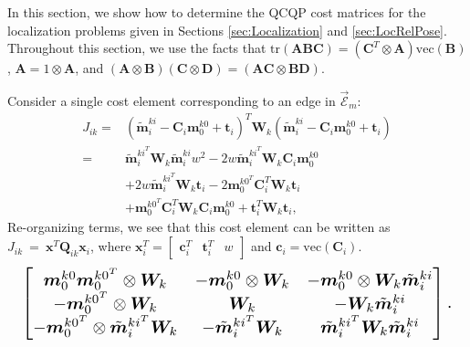 \documentclass[lettersize,journal]{IEEEtran}
\newcommand{\EdgeSet}{\vec{\bm{\mathcal{E}}}}
\newcommand{\vect}[1]{\mbox{vec}(#1)}
\newcommand{\tr}[1]{\mbox{tr}\left(#1\right)}
\begin{document}
{In this section, we show how to determine the QCQP cost matrices for the localization problems given in Sections \ref{sec:Localization} and \ref{sec:LocRelPose}. Throughout this section, we use the facts that $ \tr{\bm{A}\bm{B}\bm{C}} = (\bm{C}^T\otimes\bm{A}) \vect{\bm{B}}$, $ \bm{A} = 1\otimes\bm{A} $, and $ (\bm{A}\otimes\bm{B})(\bm{C}\otimes\bm{D}) = (\bm{AC}\otimes\bm{BD}) $\cite{magnusMatrixDifferentialCalculus2019}. 

Consider a single cost element corresponding to an edge in $\EdgeSet_m $:
\begin{align*}
	J_{ik}=&(\tilde{\bm{m}}_i^{ki} - \bm{C}_i\bm{m}_0^{k0} + \bm{t}_i)^T \bm{W}_k (\tilde{\bm{m}}_i^{ki} - \bm{C}_i\bm{m}_0^{k0} + \bm{t}_i) \\
	=& \tilde{\bm{m}}_i^{ki^T}\bm{W}_k\tilde{\bm{m}}_i^{ki} w^2 - 2 w\tilde{\bm{m}}_i^{ki^T}\bm{W}_k\bm{C}_i\bm{m}_0^{k0}  \\
	&+ 2 w\tilde{\bm{m}}_i^{ki^T}\bm{W}_k\bm{t}_i -2\bm{m}_0^{k0^T}\bm{C}_i^T\bm{W}_k\bm{t}_i\\
	& + \bm{m}_0^{k0^T}\bm{C}_i^T\bm{W}_k\bm{C}_i\bm{m}_0^{k0} + \bm{t}_i^T\bm{W}_k\bm{t}_i,
\end{align*}
Re-organizing terms, we see that this cost element can be written as $J_{ik}~=~\bm{x}^T\bm{Q}_{ik}\bm{x}_i$, where $ \bm{x}_i^T = \begin{bmatrix} \bm{c}_i^T &  \bm{t}_i^T & w \end{bmatrix} $ and $ \bm{c}_i=\vect{\bm{C}_i} $.
\begin{equation*}
	\resizebox{0.98\columnwidth}{!}{$\begin{bmatrix}
			\bm{m}_0^{k0}\bm{m}_0^{k0^T} \otimes \bm{W}_k  & -\bm{m}_0^{k0}\otimes\bm{W}_k & -\bm{m}_0^{k0}\otimes\bm{W}_k\tilde{\bm{m}}_i^{ki}\\
			 -\bm{m}_0^{k0^T}\otimes\bm{W}_k & \bm{W}_k & -\bm{W}_k\tilde{\bm{m}}_i^{ki} \\
			-\bm{m}_0^{k0^T}\otimes\tilde{\bm{m}}_i^{ki^T}\bm{W}_k & -\tilde{\bm{m}}_i^{ki^T}\bm{W}_k & \tilde{\bm{m}}_i^{ki^T}\bm{W}_k\tilde{\bm{m}}_i^{ki}
		\end{bmatrix}.$}
\end{equation*}

}
\end{document}
